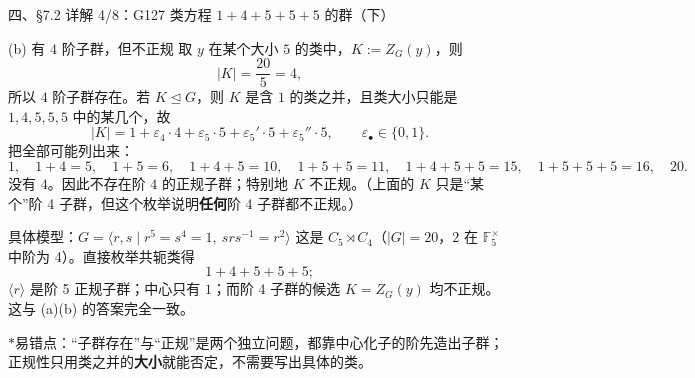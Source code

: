 \documentclass[aspectratio=169,10pt,fontset=none]{ctexbeamer}
\newcommand{\key}[1]{\textcolor{ink}{\bfseries #1}}
\newcommand{\starpt}{\textcolor{accent}{\bfseries$\ast$}}
\begin{document}
\begin{frame}[t]{四、\S7.2 详解 4/8：G127 类方程 $1+4+5+5+5$ 的群（下）}
\scriptsize
\begin{block}{\footnotesize (b) 有 $4$ 阶子群，但不正规}
取 $y$ 在某个大小 $5$ 的类中，$K:=Z_G(y)$，则
\[
|K|=\frac{20}{5}=4,
\]
所以 $4$ 阶子群存在。若 $K\trianglelefteq G$，则 $K$ 是含 $1$ 的类之并，且类大小只能是 $1,4,5,5,5$ 中的某几个，故
\[
|K|=1+\varepsilon_4\cdot4+\varepsilon_5\cdot5+\varepsilon_5'\cdot5+\varepsilon_5''\cdot5,\qquad \varepsilon_\bullet\in\{0,1\}.
\]
把全部可能列出来：
\[
1,\quad 1+4=5,\quad 1+5=6,\quad 1+4+5=10,\quad 1+5+5=11,\quad 1+4+5+5=15,\quad 1+5+5+5=16,\quad 20.
\]
没有 $4$。因此不存在阶 $4$ 的正规子群；特别地 $K$ 不正规。（上面的 $K$ 只是“某个”阶 4 子群，但这个枚举说明\key{任何}阶 4 子群都不正规。）
\end{block}
\begin{block}{\footnotesize 具体模型：$G=\langle r,s\mid r^5=s^4=1,\ srs^{-1}=r^2\rangle$}
这是 $C_5\rtimes C_4$（$|G|=20$，$2$ 在 $\mathbb F_5^\times$ 中阶为 4）。直接枚举共轭类得
\[
1+4+5+5+5;
\]
$\langle r\rangle$ 是阶 5 正规子群；中心只有 $1$；而阶 4 子群的候选 $K=Z_G(y)$ 均不正规。这与 (a)(b) 的答案完全一致。
\end{block}
\footnotesize\color{ink!80}
\starpt 易错点：“子群存在”与“正规”是两个独立问题，都靠中心化子的阶先造出子群；正规性只用类之并的\key{大小}就能否定，不需要写出具体的类。
\end{frame}
\end{document}

